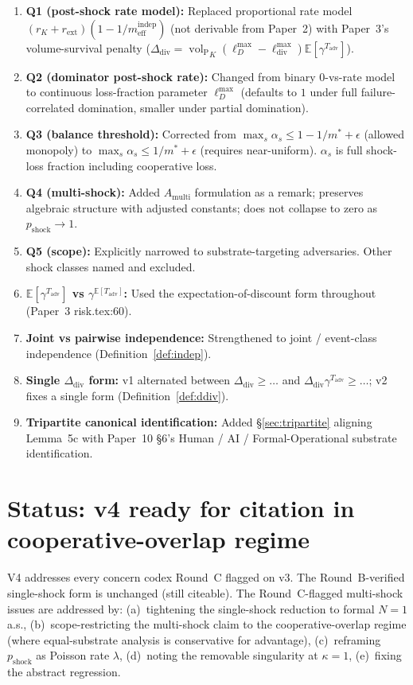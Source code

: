 \documentclass{article}
\DeclareMathOperator{\vol}{vol}
\newcommand{\volL}{{\vol_{\mathrm{P}}}}
\newcommand{\rext}{r_{\mathrm{ext}}}
\newcommand{\mindep}{m_{\mathrm{eff}}^{\mathrm{indep}}}
\newcommand{\Tadv}{T_{\mathrm{adv}}}
\newcommand{\Ddiv}{\Delta_{\mathrm{div}}}
\newcommand{\pshock}{p_{\mathrm{shock}}}
\newcommand{\lossDmax}{\ell_D^{\max}}
\newcommand{\lossdivmax}{\ell_{\mathrm{div}}^{\max}}
\begin{document}
\begin{enumerate}
\item \textbf{Q1 (post-shock rate model):} Replaced proportional
  rate model $(r_K + \rext)(1 - 1/\mindep)$ (not derivable from
  Paper~2) with Paper~3's volume-survival penalty
  ($\Ddiv = \volL_K(\lossDmax - \lossdivmax)\mathbb{E}[\gamma^{\Tadv}]$).
\item \textbf{Q2 (dominator post-shock rate):} Changed from binary
  $0$-vs-rate model to continuous loss-fraction parameter
  $\lossDmax$ (defaults to $1$ under full failure-correlated
  domination, smaller under partial domination).
\item \textbf{Q3 (balance threshold):} Corrected from
  $\max_s \alpha_s \leq 1 - 1/m^* + \epsilon$ (allowed monopoly) to
  $\max_s \alpha_s \leq 1/m^* + \epsilon$ (requires near-uniform).
  $\alpha_s$ is full shock-loss fraction including cooperative loss.
\item \textbf{Q4 (multi-shock):} Added $A_{\mathrm{multi}}$
  formulation as a remark; preserves algebraic structure with
  adjusted constants; does not collapse to zero as $\pshock \to 1$.
\item \textbf{Q5 (scope):} Explicitly narrowed to
  substrate-targeting adversaries.  Other shock classes named and
  excluded.
\item \textbf{$\mathbb{E}[\gamma^{\Tadv}]$ vs $\gamma^{\mathbb{E}[\Tadv]}$:}
  Used the expectation-of-discount form throughout
  (Paper~3 risk.tex:60).
\item \textbf{Joint vs pairwise independence:} Strengthened to joint
  / event-class independence
  (Definition~\ref{def:indep}).
\item \textbf{Single $\Ddiv$ form:} v1 alternated between
  $\Ddiv \geq \ldots$ and $\Ddiv \gamma^{\Tadv} \geq \ldots$;
  v2 fixes a single form
  (Definition~\ref{def:ddiv}).
\item \textbf{Tripartite canonical identification:} Added
  \S\ref{sec:tripartite} aligning Lemma~5c with Paper~10 \S6's
  Human / AI / Formal-Operational substrate identification.
\end{enumerate}

\section{Status: v4 ready for citation in cooperative-overlap regime}

V4 addresses every concern codex Round~C flagged on v3.  The
Round~B-verified single-shock form is unchanged (still citeable).
The Round~C-flagged multi-shock issues are addressed by:
(a)~tightening the single-shock reduction to formal $N=1$ a.s.,
(b)~scope-restricting the multi-shock claim to the
cooperative-overlap regime (where equal-substrate analysis is
conservative for advantage),
(c)~reframing $\pshock$ as Poisson rate $\lambda$,
(d)~noting the removable singularity at $\kappa = 1$,
(e)~fixing the abstract regression.
\end{document}
